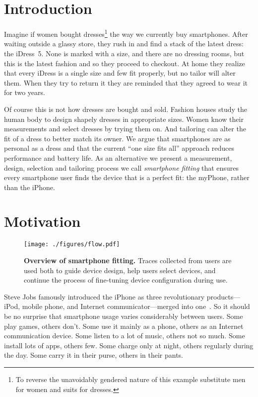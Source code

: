 \section{Introduction}

Imagine if women bought dresses\footnote{To reverse the unavoidably gendered
nature of this example substitute men for women and suits for dresses.} the
way we currently buy smartphones. After waiting outside a glassy store, they
rush in and find a stack of the latest dress: the iDress~5. None is marked
with a size, and there are no dressing rooms, but this is the latest fashion
and so they proceed to checkout. At home they realize that every iDress is a
single size and few fit properly, but no tailor will alter them. When they
try to return it they are reminded that they agreed to wear it for two years.

Of course this is not how dresses are bought and sold. Fashion houses study
the human body to design shapely dresses in appropriate sizes. Women know
their measurements and select dresses by trying them on. And tailoring can
alter the fit of a dress to better match its owner. We argue that smartphones
are as personal as a dress and that the current ``one size fits all''
approach reduces performance and battery life. As an alternative we present a
measurement, design, selection and tailoring process we call
\textit{smartphone fitting} that ensures every smartphone user finds the
device that is a perfect fit: the myPhone, rather than the iPhone.

\section{Motivation}

\begin{figure}[t]
\texttt{[image: ./figures/flow.pdf]}

\caption{\textbf{Overview of smartphone fitting.} Traces collected from users
are used both to guide device design, help users select devices, and continue
the process of fine-tuning device configuration during use.}

\label{figure-flow}
\end{figure}

Steve Jobs famously introduced the iPhone as three revolutionary
products---iPod, mobile phone, and Internet communicator---merged into
one~\cite{ipod-introduction-video}. So it should be no surprise that
smartphone usage varies considerably between users. Some play games, others
don't. Some use it mainly as a phone, others as an Internet communication
device. Some listen to a lot of music, others not so much. Some install lots
of apps, others few. Some charge only at night, others regularly during the
day. Some carry it in their purse, others in their pants.

